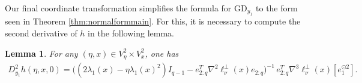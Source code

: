 \documentclass{article}
\newcommand{\GD}{\mathrm{GD}}
\theoremstyle{plain}
\newtheorem{lemma}[theorem]{Lemma}
\theoremstyle{definition}
\theoremstyle{remark}
\begin{document}
Our final coordinate transformation simplifies the formula for $\GD_{y_1}$ to the form seen in Theorem \ref{thm:normalformmain}. For this, it is necessary to compute the second derivative of $h$ in the following lemma.

\begin{lemma}
    For any $(\eta,x)\in V^2_{\eta}\times V^2_x$, one has
    \begin{align}
    D^2_{y_1}h(\eta,x,0) = \big((2\lambda_1(x)-\eta\lambda_1(x)^2)I_{q-1}-e_{2:q}^T\nabla^2\ell_{\nu}^{\perp}(x)e_{2:q}\big)^{-1}\,e_{2:q}^T\nabla^3\ell_{\nu}^{\perp}(x)[e_1^{\odot 2}].
    \end{align}
\end{lemma}
\end{document}
